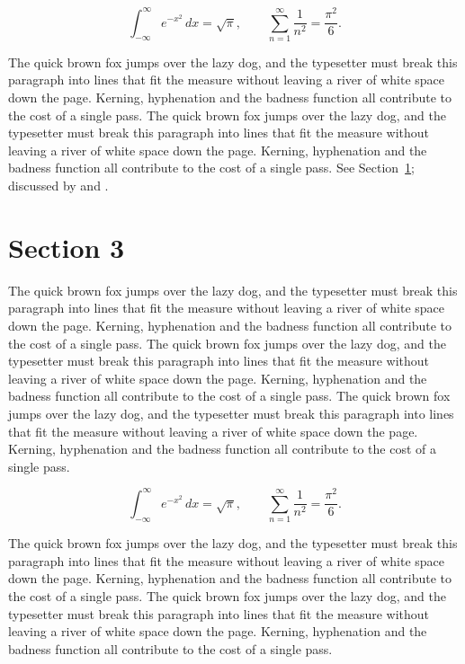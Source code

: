 \documentclass{article}
\begin{document}
\begin{equation}\label{eq:2}
\int_{-\infty}^{\infty} e^{-x^{2}}\,dx = \sqrt{\pi}, \qquad
\sum_{n=1}^{\infty} \frac{1}{n^{2}} = \frac{\pi^{2}}{6}.
\end{equation}

The quick brown fox jumps over the lazy dog, and the typesetter must break this paragraph into lines that fit the measure without leaving a river of white space down the page. Kerning, hyphenation and the badness function all contribute to the cost of a single pass. The quick brown fox jumps over the lazy dog, and the typesetter must break this paragraph into lines that fit the measure without leaving a river of white space down the page. Kerning, hyphenation and the badness function all contribute to the cost of a single pass. 
See Section~\ref{sec:3}; discussed by \textcite{k3} and \textcite{l5}.
\section{Section 3}
\label{sec:3}
The quick brown fox jumps over the lazy dog, and the typesetter must break this paragraph into lines that fit the measure without leaving a river of white space down the page. Kerning, hyphenation and the badness function all contribute to the cost of a single pass. The quick brown fox jumps over the lazy dog, and the typesetter must break this paragraph into lines that fit the measure without leaving a river of white space down the page. Kerning, hyphenation and the badness function all contribute to the cost of a single pass. The quick brown fox jumps over the lazy dog, and the typesetter must break this paragraph into lines that fit the measure without leaving a river of white space down the page. Kerning, hyphenation and the badness function all contribute to the cost of a single pass. 

\begin{equation}\label{eq:3}
\int_{-\infty}^{\infty} e^{-x^{2}}\,dx = \sqrt{\pi}, \qquad
\sum_{n=1}^{\infty} \frac{1}{n^{2}} = \frac{\pi^{2}}{6}.
\end{equation}

The quick brown fox jumps over the lazy dog, and the typesetter must break this paragraph into lines that fit the measure without leaving a river of white space down the page. Kerning, hyphenation and the badness function all contribute to the cost of a single pass. The quick brown fox jumps over the lazy dog, and the typesetter must break this paragraph into lines that fit the measure without leaving a river of white space down the page. Kerning, hyphenation and the badness function all contribute to the cost of a single pass. 
\end{document}

